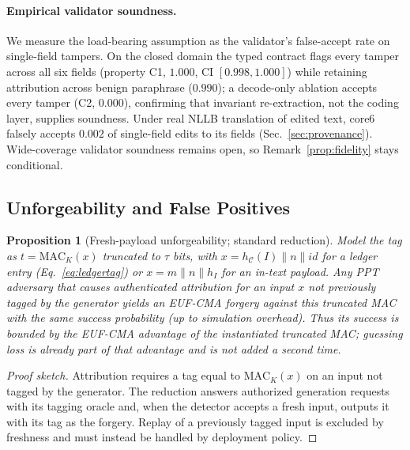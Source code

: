 \documentclass[journal]{IEEEtran}
\newtheorem{proposition}{Proposition}
\begin{document}
\paragraph{Empirical validator soundness.}
We measure the load-bearing assumption as the validator's false-accept rate on single-field tampers. On the closed domain the typed contract flags every tamper across all six fields (property C1, $1.000$, CI $[0.998,1.000]$) while retaining attribution across benign paraphrase ($0.990$); a decode-only ablation accepts every tamper (C2, $0.000$), confirming that invariant re-extraction, not the coding layer, supplies soundness. Under real NLLB translation of edited text, core6 falsely accepts $0.002$ of single-field edits to its fields (Sec.~\ref{sec:provenance}). Wide-coverage validator soundness remains open, so Remark~\ref{prop:fidelity} stays conditional.

\subsection{Unforgeability and False Positives}
\begin{proposition}[Fresh-payload unforgeability; standard reduction]
\label{thm:unforge}
Model the tag as $t=\mathrm{MAC}_K(x)$ truncated to $\tau$ bits, with $x=h_{\mathcal{C}}(I)\parallel n\parallel\mathit{id}$ for a ledger entry (Eq.~\eqref{eq:ledgertag}) or $x=m\parallel n\parallel h_I$ for an in-text payload. Any PPT adversary that causes authenticated attribution for an input $x$ not previously tagged by the generator yields an EUF-CMA forgery against this truncated MAC with the same success probability (up to simulation overhead). Thus its success is bounded by the EUF-CMA advantage of the instantiated truncated MAC; guessing loss is already part of that advantage and is not added a second time.
\end{proposition}
\begin{proof}[Proof sketch]
Attribution requires a tag equal to $\mathrm{MAC}_K(x)$ on an input not tagged by the generator. The reduction answers authorized generation requests with its tagging oracle and, when the detector accepts a fresh input, outputs it with its tag as the forgery. Replay of a previously tagged input is excluded by freshness and must instead be handled by deployment policy.
\end{proof}
\end{document}
